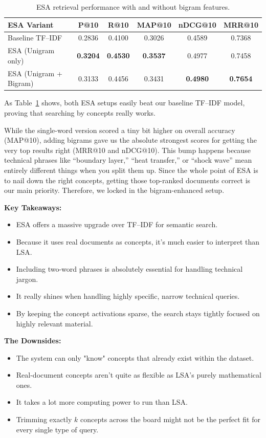 \documentclass[runningheads]{llncs}
\begin{document}
\begin{table}[htbp]
\centering
\caption{ESA retrieval performance with and without bigram features.}
\label{tab:esa-bigram}
\begin{tabular}{l c c c c c}
\toprule
\textbf{ESA Variant} &
\textbf{P@10} &
\textbf{R@10} &
\textbf{MAP@10} &
\textbf{nDCG@10} &
\textbf{MRR@10} \\
\midrule
Baseline TF--IDF & 0.2836 & 0.4100 & 0.3026 & 0.4589 & 0.7368 \\
ESA (Unigram only) & \textbf{0.3204} & \textbf{0.4530} & \textbf{0.3537} & 0.4977 & 0.7458 \\
ESA (Unigram + Bigram) & 0.3133 & 0.4456 & 0.3431 & \textbf{0.4980} & \textbf{0.7654} \\
\bottomrule
\end{tabular}
\end{table}

As Table~\ref{tab:esa-bigram} shows, both ESA setups easily beat our baseline TF--IDF model, proving that searching by concepts really works. 

While the single-word version scored a tiny bit higher on overall accuracy (MAP@10), adding bigrams gave us the absolute strongest scores for getting the very top results right (MRR@10 and nDCG@10). This bump happens because technical phrases like ``boundary layer,'' ``heat transfer,'' or ``shock wave'' mean entirely different things when you split them up. Since the whole point of ESA is to nail down the right concepts, getting those top-ranked documents correct is our main priority. Therefore, we locked in the bigram-enhanced setup.

\textbf{Key Takeaways:}
\begin{itemize}
    \item ESA offers a massive upgrade over TF--IDF for semantic search.
    \item Because it uses real documents as concepts, it's much easier to interpret than LSA.
    \item Including two-word phrases is absolutely essential for handling technical jargon.
    \item It really shines when handling highly specific, narrow technical queries.
    \item By keeping the concept activations sparse, the search stays tightly focused on highly relevant material.
\end{itemize}

\textbf{The Downsides:}
\begin{itemize}
    \item The system can only "know" concepts that already exist within the dataset.
    \item Real-document concepts aren't quite as flexible as LSA's purely mathematical ones.
    \item It takes a lot more computing power to run than LSA.
    \item Trimming exactly $k$ concepts across the board might not be the perfect fit for every single type of query.
\end{itemize}
\end{document}
